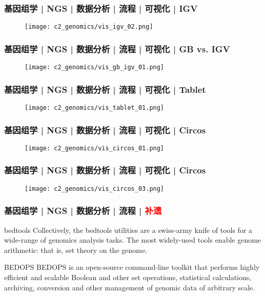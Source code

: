 \begin{frame}
  \frametitle{基因组学 | NGS | 数据分析 | 流程 | 可视化 | IGV}
  \begin{figure}
    \centering
    \texttt{[image: c2\_genomics/vis\_igv\_02.png]}
  \end{figure}
\end{frame}

\begin{frame}
  \frametitle{基因组学 | NGS | 数据分析 | 流程 | 可视化 | GB vs. IGV}
  \begin{figure}
    \centering
    \texttt{[image: c2\_genomics/vis\_gb\_igv\_01.png]}
  \end{figure}
\end{frame}

\begin{frame}
  \frametitle{基因组学 | NGS | 数据分析 | 流程 | 可视化 | Tablet}
  \begin{figure}
    \centering
    \texttt{[image: c2\_genomics/vis\_tablet\_01.png]}
  \end{figure}
\end{frame}

\begin{frame}
  \frametitle{基因组学 | NGS | 数据分析 | 流程 | 可视化 | Circos}
  \begin{figure}
    \centering
    \texttt{[image: c2\_genomics/vis\_circos\_01.png]}
  \end{figure}
\end{frame}

\begin{frame}
  \frametitle{基因组学 | NGS | 数据分析 | 流程 | 可视化 | Circos}
  \begin{figure}
    \centering
    \texttt{[image: c2\_genomics/vis\_circos\_03.png]}
  \end{figure}
\end{frame}

\begin{frame}
  \frametitle{基因组学 | NGS | 数据分析 | 流程 | \textcolor{red}{补遗}}
  \begin{block}{bedtools}
    Collectively, the bedtools utilities are a swiss-army knife of tools for a wide-range of genomics analysis tasks. The most widely-used tools enable genome arithmetic: that is, set theory on the genome.
  \end{block}
  \pause
  \begin{block}{BEDOPS}
    BEDOPS is an open-source command-line toolkit that performs highly efficient and scalable Boolean and other set operations, statistical calculations, archiving, conversion and other management of genomic data of arbitrary scale.
  \end{block}
\end{frame}


